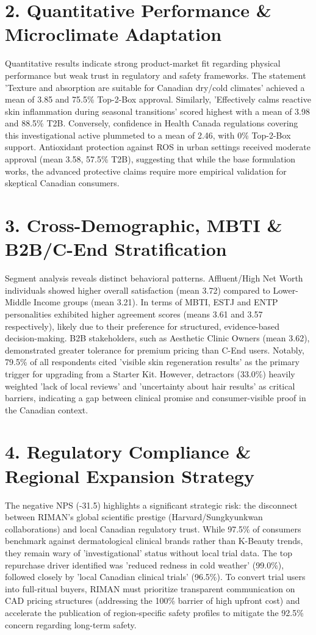 \documentclass[10pt,twocolumn,a4paper]{article}
\begin{document}
\section{2. Quantitative Performance \& Microclimate Adaptation}
Quantitative results indicate strong product-market fit regarding physical performance but weak trust in regulatory and safety frameworks. The statement 'Texture and absorption are suitable for Canadian dry/cold climates' achieved a mean of 3.85 and 75.5\% Top-2-Box approval. Similarly, 'Effectively calms reactive skin inflammation during seasonal transitions' scored highest with a mean of 3.98 and 88.5\% T2B. Conversely, confidence in Health Canada regulations covering this investigational active plummeted to a mean of 2.46, with 0\% Top-2-Box support. Antioxidant protection against ROS in urban settings received moderate approval (mean 3.58, 57.5\% T2B), suggesting that while the base formulation works, the advanced protective claims require more empirical validation for skeptical Canadian consumers.
\section{3. Cross-Demographic, MBTI \& B2B/C-End Stratification}
Segment analysis reveals distinct behavioral patterns. Affluent/High Net Worth individuals showed higher overall satisfaction (mean 3.72) compared to Lower-Middle Income groups (mean 3.21). In terms of MBTI, ESTJ and ENTP personalities exhibited higher agreement scores (means 3.61 and 3.57 respectively), likely due to their preference for structured, evidence-based decision-making. B2B stakeholders, such as Aesthetic Clinic Owners (mean 3.62), demonstrated greater tolerance for premium pricing than C-End users. Notably, 79.5\% of all respondents cited 'visible skin regeneration results' as the primary trigger for upgrading from a Starter Kit. However, detractors (33.0\%) heavily weighted 'lack of local reviews' and 'uncertainty about hair results' as critical barriers, indicating a gap between clinical promise and consumer-visible proof in the Canadian context.
\section{4. Regulatory Compliance \& Regional Expansion Strategy}
The negative NPS (-31.5) highlights a significant strategic risk: the disconnect between RIMAN's global scientific prestige (Harvard/Sungkyunkwan collaborations) and local Canadian regulatory trust. While 97.5\% of consumers benchmark against dermatological clinical brands rather than K-Beauty trends, they remain wary of 'investigational' status without local trial data. The top repurchase driver identified was 'reduced redness in cold weather' (99.0\%), followed closely by 'local Canadian clinical trials' (96.5\%). To convert trial users into full-ritual buyers, RIMAN must prioritize transparent communication on CAD pricing structures (addressing the 100\% barrier of high upfront cost) and accelerate the publication of region-specific safety profiles to mitigate the 92.5\% concern regarding long-term safety.
\end{document}
